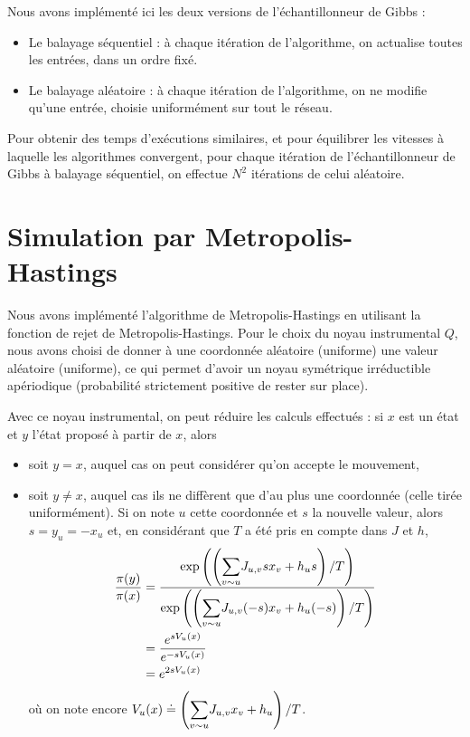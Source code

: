 \documentclass[a4paper,11pt]{article}
\begin{document}
Nous avons implémenté ici les deux versions de l'échantillonneur de Gibbs :
\begin{itemize}
	\item Le balayage séquentiel : à chaque itération de l'algorithme, on actualise toutes les entrées, dans un ordre fixé.
	\item Le balayage aléatoire : à chaque itération de l'algorithme, on ne modifie qu'une entrée, choisie uniformément sur tout le réseau.
\end{itemize}
Pour obtenir des temps d'exécutions similaires, et pour équilibrer les vitesses à laquelle les algorithmes convergent, pour chaque itération de l'échantillonneur de Gibbs à balayage séquentiel, on effectue $N^2$ itérations de celui aléatoire.

\section{Simulation par Metropolis-Hastings}\label{sec:MH}

Nous avons implémenté l'algorithme de Metropolis-Hastings en utilisant la fonction de rejet de Metropolis-Hastings. Pour le choix du noyau instrumental $Q$, nous avons choisi de donner à une coordonnée aléatoire (uniforme) une valeur aléatoire (uniforme), ce qui permet d'avoir un noyau symétrique irréductible apériodique (probabilité strictement positive de rester sur place).

Avec ce noyau instrumental, on peut réduire les calculs effectués : si $x$ est un état et $y$ l'état proposé à partir de $x$, alors
\begin{itemize}
	\item soit $y = x$, auquel cas on peut considérer qu'on accepte le mouvement,
	\item soit $y \neq x$, auquel cas ils ne diffèrent que d'au plus une coordonnée (celle tirée uniformément). Si on note $u$ cette coordonnée et $s$ la nouvelle valeur, alors $s = y_u = - x_u$ et, en considérant que $T$ a été pris en compte dans $J$ et $h$,
	\begin{align*}
	\frac{\pi(y)}{\pi(x)}
	&= \frac{\exp \left(\left( \displaystyle{\sum_{v \sim u}^{}} J_{u,v} s x_{v} + h_{u} s \right) /T \right)}{\exp \left(\left( \displaystyle{\sum_{v \sim u}^{}} J_{u,v} (-s) x_{v} + h_{u} (-s) \right) /T \right)}\\
	&= \frac{e^{s V_u(x)}}{e^{-s V_u(x)}}\\
	&= e^{2 s V_u(x)}
	\end{align*}
	où on note encore $V_u(x) \doteq \left( \displaystyle{\sum_{v \sim u}^{}} J_{u,v} x_v + h_u \right) /T$.
\end{itemize}
\end{document}
